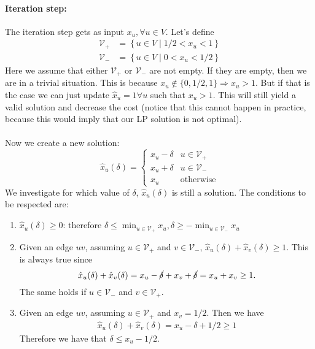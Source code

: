 \documentclass[11pt]{article}
\begin{document}
    \paragraph*{Iteration step:} The iteration step gets as input $x_u,\forall u \in V$. Let's define
    \begin{align*}
        \mathcal{V}_+ &= \left\{ u \in V \mid 1/2 < x_u < 1 \right\}\\
        \mathcal{V}_- &= \left\{ u \in V \mid 0 < x_u < 1/2 \right\}
    \end{align*}
    Here we assume that either $\mathcal{V}_+$ or $\mathcal{V}_-$ are not empty. If they are empty, then we are in a trivial situation. This is because $x_u\notin\{0,1/2,1\} \Rightarrow x_u > 1$. But if that is the case we can just update $\hat x_u = 1 \forall
    u$ such that $x_u > 1$. This will still yield a valid solution and decrease the cost (notice that this cannot happen in practice, because this would imply that our LP solution is not optimal). \\\\
    Now we create a new solution:
    \begin{equation*}
        \hat x_u(\delta)= \begin{cases}
            x_u - \delta & u \in \mathcal{V}_+\\
            x_u + \delta & u \in \mathcal{V}_-\\
            x_u & \text{otherwise}
        \end{cases}
    \end{equation*}
    We investigate for which value of $\delta$, $\hat x_u(\delta)$ is still a solution. The conditions to be respected are:
    \begin{enumerate}
        \item\label{c:1} $\hat x_u(\delta) \geq 0$: therefore $\delta \leq \min_{u\in \mathcal{V}_+}x_u, \delta \geq - \min_{u\in \mathcal{V}_-}x_u$
        \item\label{c:2} Given an edge $uv$, assuming $u \in \mathcal{V}_+$ and $v \in \mathcal{V}_-$, $\hat x_u(\delta)+\hat x_v(\delta) \geq 1$. This is always true since
        \begin{equation*}
            \hat x_u(\delta)+\hat x_v(\delta) = x_u - \cancel{\delta} + x_v + \cancel{\delta} = x_u + x_v \geq 1.
        \end{equation*}
        The same holds if $u \in \mathcal{V}_-$ and $v \in \mathcal{V}_+$. 
        \item\label{c:3} Given an edge $uv$, assuming $u \in \mathcal{V}_+$ and $x_v = 1/2$. Then we have 
        \begin{align*}
            \hat x_u(\delta)+\hat x_v(\delta) = x_u - \delta + 1/2 \geq 1
        \end{align*}
        Therefore we have that $\delta \leq x_u-1/2$.
    \end{enumerate}
\end{document}

